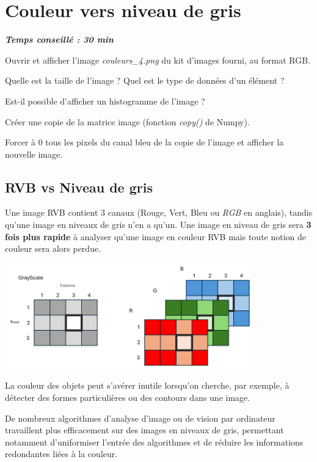 \documentclass[a4paper,11pt,titlepage]{article} %
\begin{document}
\section{Couleur vers niveau de gris}

\begin{center} \textbf{\textit{Temps conseillé : 30 min}} \end{center}

\Manip Ouvrir et afficher l'image \textsl{couleurs\_4.png} du kit d'images fourni, au format RGB.

\Quest Quelle est la taille de l'image ? Quel est le type de données d'un élément ?


\Quest Est-il possible d'afficher un histogramme de l'image ? 

\Manip Créer une copie de la matrice image (fonction \textsl{copy()} de Numpy). 

\Manip Forcer à 0 tous les pixels du canal bleu de la copie de l'image et afficher la nouvelle image.


\subsection{RVB vs Niveau de gris}

Une image RVB contient 3 canaux (Rouge, Vert, Bleu ou \textit{RGB} en anglais), tandis qu'une image en niveaux de gris n'en a qu'un. Une image en niveau de gris sera \textbf{3 fois plus rapide} à analyser qu'une image en couleur RVB mais toute notion de couleur sera alors perdue.

\begin{center}
	\includegraphics[width=0.8\textwidth]{images/images_array_gray_rgb.png}
\end{center}


La couleur des objets peut s'avérer inutile lorsqu'on cherche, par exemple, à détecter des formes particulières ou des contours dans une image.

De nombreux algorithmes d'analyse d'image ou de vision par ordinateur travaillent plus efficacement sur des images en niveaux de gris, permettant notamment d'uniformiser l'entrée des algorithmes et de réduire les informations redondantes liées à la couleur.
\end{document}
